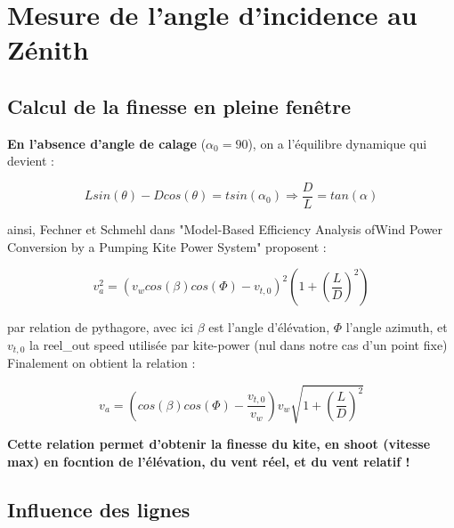 \chapter{Mesure de l'angle d'incidence au Zénith}
\label{ch:Ch3}

\section{Calcul de la finesse en pleine fenêtre} 
\label{sec:Ch3.1}

\textbf{En l'absence d'angle de calage} ($\alpha_0 = 90$\textdegree), on a l'équilibre dynamique qui devient :
\begin{center}
    \begin{equation}
        L sin(\theta) - D cos(\theta) = t sin(\alpha_0) \Rightarrow \frac{D}{L} = tan(\alpha)
        \label{eq : l_over_d}
    \end{equation}
\end{center}

ainsi, Fechner et Schmehl dans "Model-Based Efficiency Analysis ofWind Power Conversion by a Pumping Kite Power System" proposent : 

\begin{center}
    \begin{equation}
        v_a^2 = (v_w cos(\beta) cos(\Phi) - v_{t,0})^2( 1 + (\frac{L}{D})^2)
    \end{equation}
\end{center}

par relation de pythagore, avec ici $\beta$ est l'angle d'élévation, $\Phi$ l'angle azimuth, et $v_{t,0}$ la reel\_out speed utilisée par kite-power (nul dans notre cas d'un point fixe)\\

Finalement on obtient la relation : 
\begin{center}
    \begin{equation}
        v_a = ( cos(\beta) cos(\Phi) - \frac{v_{t,0}}{v_w}) v_w \sqrt{ 1 + (\frac{L}{D})^2}
    \end{equation}
\end{center}

\textbf{Cette relation permet d'obtenir la finesse du kite, en shoot (vitesse max) en focntion de l'élévation, du vent réel, et du vent relatif !}

\section{Influence des lignes}

